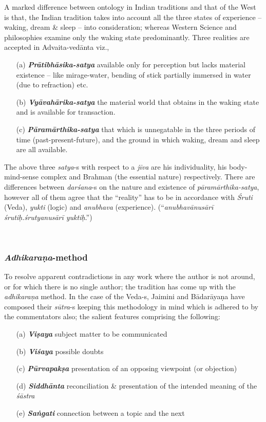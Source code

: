 A marked difference between ontology in Indian traditions and that of the West is that, the Indian tradition takes into account all the three states of experience -- waking, dream \& sleep -- into consideration; whereas Western Science and philosophies examine only the waking state predominantly. Three realities are accepted in Advaita-vedānta viz.,
\begin{itemize}
\item[(a)] {{\sl\bfseries Prātibhāsika-satya}\relax}  available only for perception but lacks material existence -- like mirage-water, bending of stick partially immersed in water (due to refraction) etc.

\item[(b)] {{\sl\bfseries Vyāvahārika-satya}\relax} the material world that obtains in the waking state and is available for transaction.

\newpage

\item[(c)] {{\sl\bfseries Pāramārthika-satya}\relax} that which is unnegatable in the three periods of time (past-present-future), and the ground in which waking, dream and sleep are all available.
\end{itemize}

The above three {\sl satya}-s with respect to a {\sl jīva} are his individuality, his body-mind-sense complex and Brahman (the essential nature) respectively. There are differences between {\sl darśana}-s on the nature and existence of {\sl pāramārthika-satya}, however all of them agree that the ``reality'' has to be in accordance with {\sl Śruti} (Veda), {\sl yukti} (logic) and {\sl anubhava} (experience). (``{\sl anubhavānusārī śrutiḥ.śrutyanusārī yuktiḥ}.'')

~
\subsubsection{{{\sl\bfseries Adhikaraṇa}\relax}-method}

To resolve apparent contradictions in any work where the author is not around, or for which there is no single author; the tradition has come up with the {\sl adhikaraṇa} method. In the case of the Veda-s, Jaimini and Bādarāyaṇa have composed their {\sl sūtra}-s keeping this methodology in mind which is adhered to by the commentators also; the salient features comprising the following:
\begin{itemize}
\item[(a)] {{\sl\bfseries Viṣaya}\relax} subject matter to be communicated

\item[(b)] {{\sl\bfseries Viśaya}\relax} possible doubts

\item[(c)] {{\sl\bfseries Pūrvapakṣa}\relax} presentation of an opposing viewpoint (or objection)

\item[(d)] {{\sl\bfseries Siddhānta}\relax} reconciliation \& presentation of the intended meaning of the {\sl śāstra}

\item[(e)] {{\sl\bfseries Saṅgati}\relax} connection between a topic and the next 
\end{itemize}

